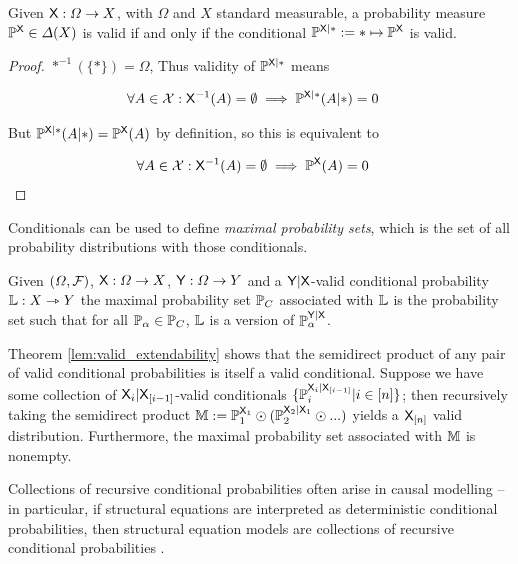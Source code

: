 \begin{theorem}\label{th:valid_agree}
Given $\mathsf{X}:\Omega\to X$, with $\Omega$ and $X$ standard measurable, a probability measure $\mathbb{P}^{\mathsf{X}}\in \Delta(X)$ is valid if and only if the conditional $\mathbb{P}^{\mathsf{X}|*}:=*\mapsto \mathbb{P}^{\mathsf{X}}$ is valid.
\end{theorem}

\begin{proof}
$*^{-1} (\{*\})=\Omega$, Thus validity of $\mathbb{P}^{\mathsf{X}|*}$ means 

\begin{align}
    \forall A\in \mathcal{X}: \mathsf{X}^{-1}( A)=\emptyset \implies \mathbb{P}^{\mathsf{X}|*}(A|*)&=0
\end{align}

But $\mathbb{P}^{\mathsf{X}|*}(A|*)=\mathbb{P}^{\mathsf{X}}(A)$ by definition, so this is equivalent to

\begin{align}
    \forall A\in \mathcal{X}: \mathsf{X}^{-1}( A)=\emptyset \implies \mathbb{P}^{\mathsf{X}}(A)&=0
\end{align}
\end{proof}

Conditionals can be used to define \emph{maximal probability sets}, which is the set of all probability distributions with those conditionals.

\begin{definition}
Given $(\Omega,\mathcal{F})$, $\mathsf{X}:\Omega\to X$, $\mathsf{Y}:\Omega\to Y$ and a $\mathsf{Y}|\mathsf{X}$-valid conditional probability $\mathbb{L}:X\rightarrowtriangle Y$ the maximal probability set $\mathbb{P}_C$ associated with $\mathbb{L}$ is the probability set such that for all $\mathbb{P}_\alpha\in \mathbb{P}_C$, $\mathbb{L}$ is a version of $\mathbb{P}_\alpha^{\mathsf{Y}|\mathsf{X}}$.
\end{definition}

Theorem \ref{lem:valid_extendability} shows that the semidirect product of any pair of valid conditional probabilities is itself a valid conditional. Suppose we have some collection of $\mathsf{X}_i|\mathsf{X}_{[i-1]}$-valid conditionals $\{\mathbb{P}_i^{\mathsf{X}_i|\mathsf{X}_{[i-1]}}|i\in [n]\}$; then recursively taking the semidirect product $\mathbb{M}:=\mathbb{P}_1^{\mathsf{X}_1}\odot (\mathbb{P}_2^{\mathsf{X}_2|\mathsf{X}_{1}}\odot ...)$ yields a $\mathsf{X}_{[n]}$ valid distribution. Furthermore, the maximal probability set associated with $\mathbb{M}$ is nonempty.

Collections of recursive conditional probabilities often arise in causal modelling -- in particular, if structural equations are interpreted as deterministic conditional probabilities, then structural equation models are collections of recursive conditional probabilities \citet{richardson2013single,pearl_causality:_2009}.

